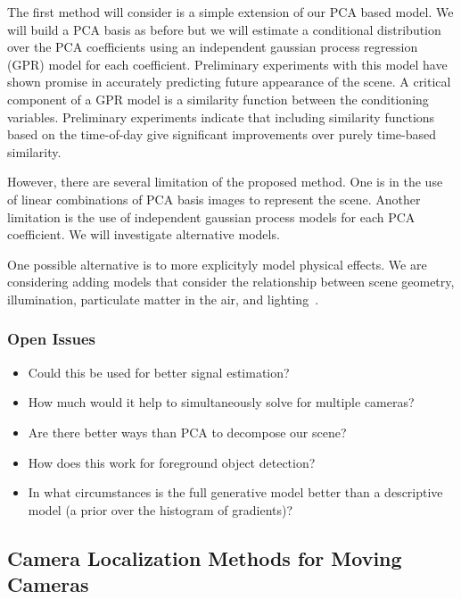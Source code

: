 The first method will consider is a simple extension of our PCA based
model.  We will build a PCA basis as before but we will estimate a
conditional distribution over the PCA coefficients using an
independent gaussian process regression (GPR) model for each
coefficient.  Preliminary experiments with this model have shown
promise in accurately predicting future appearance of the scene.  A
critical component of a GPR model is a similarity function between the
conditioning variables.  Preliminary experiments indicate that
including similarity functions based on the time-of-day give
significant improvements over purely time-based similarity.

However, there are several limitation of the proposed method.  One is
in the use of linear combinations of PCA basis images to represent the
scene.  Another limitation is the use of independent gaussian process
models for each PCA coefficient.  We will investigate alternative
models.

One possible alternative is to more explicityly model physical
effects.  We are considering adding models that consider the
relationship between scene geometry, illumination, particulate matter
in the air, and lighting~\cite{basriPhotometric,sheddingLight}.

\subsubsection{Open Issues}

\begin{itemize}

  \item Could this be used for better signal estimation?
   
  \item How much would it help to simultaneously solve for multiple
    cameras?

  \item Are there better ways than PCA to decompose our scene?

  \item How does this work for foreground object detection? 

  \item In what circumstances is the full generative model better than
    a descriptive model (\eg a prior over the histogram of gradients)?

\end{itemize}


%
%
%
\subsection{Camera Localization Methods for Moving Cameras}
\label{sec:movingLocalization}

